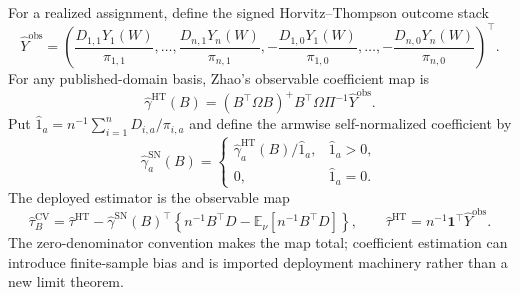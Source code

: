 For a realized assignment, define the signed Horvitz--Thompson outcome stack
\[
 \widehat Y^{\mathrm{obs}}
 =\left(\frac{D_{1,1}Y_1(W)}{\pi_{1,1}},\ldots,
 \frac{D_{n,1}Y_n(W)}{\pi_{n,1}},
 -\frac{D_{1,0}Y_1(W)}{\pi_{1,0}},\ldots,
 -\frac{D_{n,0}Y_n(W)}{\pi_{n,0}}\right)^{\top}.
\]
For any published-domain basis, Zhao's observable coefficient map is
\[
 \widehat\gamma^{\mathrm{HT}}(B)
 =(B^{\top}\Omega B)^+B^{\top}\Omega\Pi^{-1}\widehat Y^{\mathrm{obs}}.
\]
Put \(\widehat 1_a=n^{-1}\sum_{i=1}^nD_{i,a}/\pi_{i,a}\) and define the armwise self-normalized coefficient by
\[
 \widehat\gamma^{\mathrm{SN}}_a(B)=
 \begin{cases}
 \widehat\gamma^{\mathrm{HT}}_a(B)/\widehat 1_a,&\widehat 1_a>0,\\
 0,&\widehat 1_a=0.
 \end{cases}
\]
The deployed estimator is the observable map
\[
 \widehat\tau_B^{\mathrm{CV}}
 =\widehat\tau^{\mathrm{HT}}
 -\widehat\gamma^{\mathrm{SN}}(B)^{\top}
 \left\{n^{-1}B^{\top}D-\mathbb E_\nu[n^{-1}B^{\top}D]\right\},
 \qquad
 \widehat\tau^{\mathrm{HT}}=n^{-1}\mathbf1^{\top}\widehat Y^{\mathrm{obs}}.
\]
The zero-denominator convention makes the map total; coefficient estimation can introduce finite-sample bias and is imported deployment machinery rather than a new limit theorem.